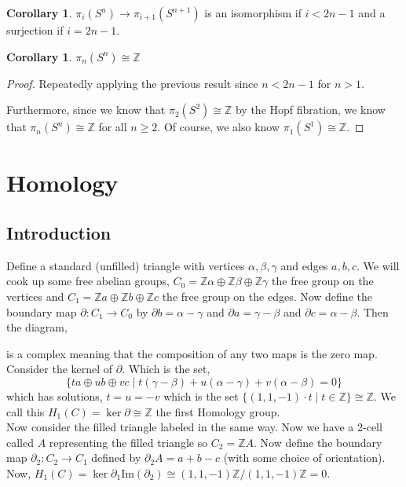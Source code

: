 \documentclass[12pt]{extarticle}
\newcommand{\Z}{\mathbb{Z}}
\renewcommand{\Im}[1]{\mathrm{Im}(#1)}
\theoremstyle{definition}
\newtheorem{corollary}[theorem]{Corollary}
\begin{document}
\begin{corollary}
$\pi_i(S^n) \to \pi_{i + 1}(S^{n+1})$ is an isomorphism if $i < 2n - 1$ and a surjection if $i = 2n - 1$.
\end{corollary}

\begin{corollary}
$\pi_n(S^n) \cong \Z$
\end{corollary}
\begin{proof}
Repeatedly applying the previous result since $n < 2n - 1$ for $n > 1$. 
\begin{center}
\end{center}
Furthermore, since we know that $\pi_2(S^2) \cong \Z$ by the Hopf fibration, we know that $\pi_n(S^n) \cong \Z$ for all $n \ge 2$. Of course, we also know $\pi_1(S^1) \cong \Z$. 
\end{proof}

\section{Homology}


\subsection{Introduction}

Define a standard (unfilled) triangle with vertices $\alpha, \beta, \gamma$ and edges $a,b,c$. We will cook up some free abelian groups, $C_0 = \Z \alpha \oplus \Z \beta \oplus \Z \gamma$ the free group on the vertices and $C_1 = \Z a \oplus \Z b \oplus \Z c$ the free group on the edges. Now define the boundary map $\partial : C_1 \to C_0$ by $\partial b = \alpha - \gamma$ and $\partial a = \gamma - \beta$ and $\partial c = \alpha - \beta$. Then the diagram,
\begin{center}
\end{center}
is a complex meaning that the composition of any two maps is the zero map. Consider the kernel of $\partial$. Which is the set,
\[ \{ t a \oplus ub \oplus vc  \mid t(\gamma - \beta) + u(\alpha - \gamma) + v(\alpha - \beta) = 0 \} \]
which has solutions, $t = u = - v$ which is the set $\{ (1, 1, -1) \cdot t \mid t \in \Z\} \cong \Z$. We call this $H_1(C) = \ker{\partial} \cong \Z$ the first Homology group. \bigskip\\
Now consider the filled triangle labeled in the same way. Now we have a 2-cell called $A$ representing the filled triangle so $C_2 = \Z A$. Now define the boundary map $\partial_2 : C_2 \to C_1$ defined by $\partial_2 A = a + b - c$ (with some choice of orientation). Now, $H_1(C) = \ker{\partial_1}{\Im{\partial_2}} \cong (1, 1, -1) \Z / (1,1,-1)\Z = 0$.   
\end{document}
